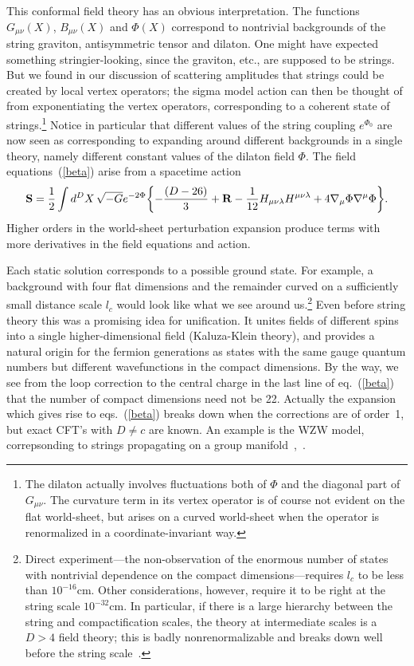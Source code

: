 This conformal field theory has an obvious interpretation.  The
functions $G_{\mu\nu}(X)$, $B_{\mu\nu}(X)$ and $\Phi(X)$
correspond to nontrivial backgrounds of the string graviton,
antisymmetric tensor and dilaton.  One might have expected
something stringier-looking, since the graviton, etc., are
supposed to be strings.  But we found in our discussion of
scattering amplitudes that strings could be created by local
vertex operators; the sigma model action can then be thought of
from exponentiating the vertex operators, corresponding to a
coherent state of strings.\footnote{The dilaton actually involves
fluctuations both of $\Phi$ and the diagonal part of $G_{\mu\nu}$.
The curvature term in its vertex operator is of course not evident
on the flat world-sheet, but arises on a curved world-sheet when
the operator is renormalized in a coordinate-invariant way.}
Notice in particular that different values of the string coupling
$e^{\Phi_0}$ are now seen as corresponding to expanding around
different backgrounds in a single theory, namely different constant
values of the dilaton field $\Phi$.  The field equations~(\ref{beta})
arise from a spacetime action
\begin{equation}
{\bf {S}} = \frac{1}{2} \int d^D X\, \sqrt{-G} e^{-2 \Phi}
\biggl\{ - \frac{(D-26)}{3}
+ {\bf {R}} -\frac{1}{12} H_{\mu\nu\lambda} H^{\mu\nu\lambda}
+4 \nabla_\mu \Phi \nabla^\mu \Phi  \biggr\} . \label{stact}
\end{equation}
Higher orders in the world-sheet perturbation expansion produce
terms with more derivatives in the field equations and action.

Each static solution corresponds to a possible ground state. 
For example, a background with four flat
dimensions and the remainder curved on a sufficiently small
distance scale $l_c$ would look like what we see around us.\footnote
{Direct experiment---the non-observation of the enormous number of
states with nontrivial dependence on the compact
dimensions---requires $l_c$ to be less than $10^{-16}$cm.  Other
considerations, however, require it to be right at the string scale
$10^{-32}$cm.  In particular, if there is a large hierarchy
between the string and compactification scales, the theory at
intermediate scales is a $D > 4$ field theory; this is badly
nonrenormalizable and breaks down well before the string
scale~\cite{Kscale}.} Even before string theory this was a promising
idea for unification.  It unites fields of different spins into a
single higher-dimensional field (Kaluza-Klein theory), and provides a
natural origin for the fermion generations as states with the same
gauge quantum numbers but different wavefunctions in the compact
dimensions.  By the way, we see from the loop correction to the
central charge in the last line of eq.~(\ref{beta})
 that the number of compact dimensions need not be
22.  Actually the expansion which gives rise to eqs.~(\ref{beta})
breaks down when the corrections are of order~1, but exact CFT's
with $D \neq c$ are known. An example is the WZW model,
correpsonding to strings propagating on a group
manifold~\cite{JSR},~\cite{GepW}.

